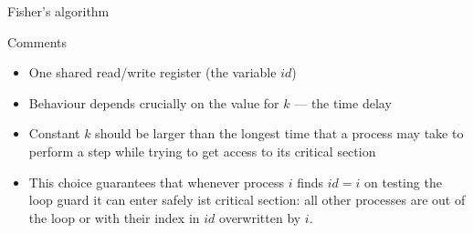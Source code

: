 \documentclass{beamer}
\def\dgold#1{{\darkgoldenrod #1}}
\def\dkb#1{{\blue #1}}
\begin{document}
%


\begin{slide}{Fisher's algorithm}
\small
\begin{block}{Comments}
\begin{itemize}
\item One shared read/write register (the variable $id$)
\item Behaviour depends crucially on the value for $k$ --- the \dkb{time delay}
\item Constant $k$ should be \dgold{larger than the longest time that a process may take to perform a step while trying to get access to its critical section} 
\item This choice guarantees that whenever process $i$ finds $id = i$ on testing the loop guard it can enter safely ist critical section: \dgold{all} other processes are out of the loop or with their index in $id$ overwritten by $i$.
\end{itemize}
\end{block}
\end{slide}
\end{document}
